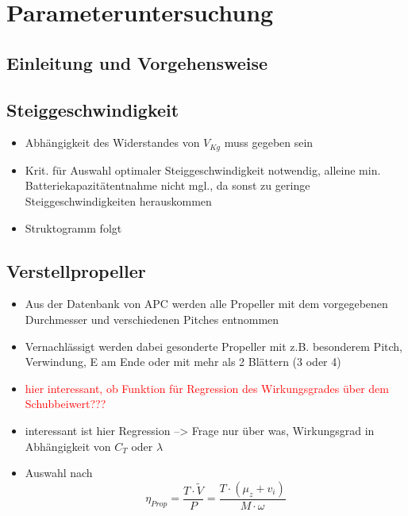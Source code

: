\chapter{Parameteruntersuchung}
\label{chap:parameteruntersuchung}

\section{Einleitung und Vorgehensweise}
\label{sec:einleitung_und_vorgehensweise}

\section{Steiggeschwindigkeit}
\label{sec:steiggeschwindigkeit}

\begin{itemize}
	\item Abhängigkeit des Widerstandes von \ensuremath{V_{Kg}} muss gegeben sein
	\item Krit. für Auswahl optimaler Steiggeschwindigkeit notwendig, alleine min. Batteriekapazitätentnahme nicht mgl., da sonst zu geringe Steiggeschwindigkeiten herauskommen
	\item Struktogramm folgt
\end{itemize}

\section{Verstellpropeller}
\label{sec:verstellprop}

\begin{itemize}
	\item Aus der Datenbank von APC werden alle Propeller mit dem vorgegebenen Durchmesser und verschiedenen Pitches entnommen
	\item Vernachlässigt werden dabei gesonderte Propeller mit z.B. besonderem Pitch, Verwindung, E am Ende oder mit mehr als 2 Blättern (3 oder 4)
	\item \textcolor{red}{hier interessant, ob Funktion für Regression des Wirkungsgrades über dem Schubbeiwert???}
	\item interessant ist hier Regression --> Frage nur über was, Wirkungsgrad in Abhängigkeit von \ensuremath{C_T} oder \ensuremath{\lambda}
	\item Auswahl nach 
	\begin{equation}
		\eta_{Prop} = \frac{T\cdot\tilde{V}}{P} = \frac{T\cdot (\mu_z + v_i)}{M\cdot \omega}
	\end{equation}
\end{itemize}

